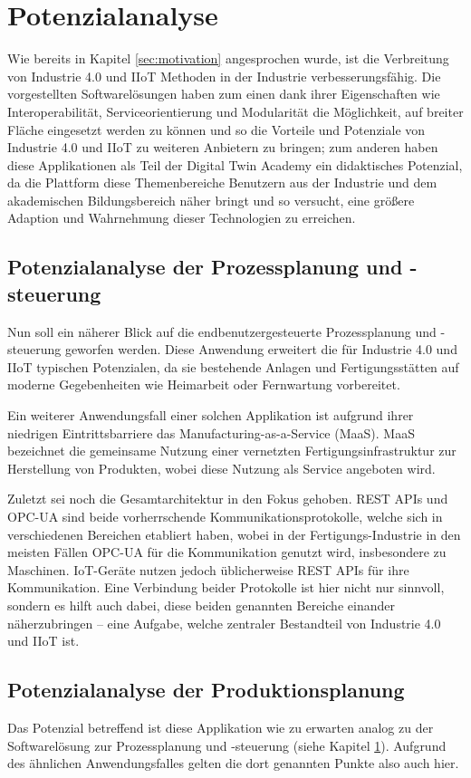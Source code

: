\section{Potenzialanalyse}
\label{sec:potenzialanalyse}

Wie bereits in Kapitel \ref{sec:motivation} angesprochen wurde, ist die Verbreitung von Industrie 4.0 und IIoT Methoden in der Industrie verbesserungsfähig. Die vorgestellten Softwarelösungen haben zum einen dank ihrer Eigenschaften wie Interoperabilität, Serviceorientierung und Modularität die Möglichkeit, auf breiter Fläche eingesetzt werden zu können und so die Vorteile und Potenziale von Industrie 4.0 und IIoT zu weiteren Anbietern zu bringen; zum anderen haben diese Applikationen als Teil der Digital Twin Academy ein didaktisches Potenzial, da die Plattform diese Themenbereiche Benutzern aus der Industrie und dem akademischen Bildungsbereich näher bringt und so versucht, eine größere Adaption und Wahrnehmung dieser Technologien zu erreichen.

\subsection*{Potenzialanalyse der Prozessplanung und -steuerung}

Nun soll ein näherer Blick auf die endbenutzergesteuerte Prozessplanung und -steuerung geworfen werden. Diese Anwendung erweitert die für Industrie 4.0 und IIoT typischen Potenzialen, da sie bestehende Anlagen und Fertigungsstätten auf moderne Gegebenheiten wie Heimarbeit oder Fernwartung vorbereitet.

Ein weiterer Anwendungsfall einer solchen Applikation ist aufgrund ihrer niedrigen Eintrittsbarriere das Manufacturing-as-a-Service (MaaS). MaaS bezeichnet die gemeinsame Nutzung einer vernetzten Fertigungsinfrastruktur zur Herstellung von Produkten, wobei diese Nutzung als Service angeboten wird. 

Zuletzt sei noch die Gesamtarchitektur in den Fokus gehoben. REST APIs und OPC-UA sind beide vorherrschende Kommunikationsprotokolle, welche sich in verschiedenen Bereichen etabliert haben, wobei in der Fertigungs-Industrie in den meisten Fällen OPC-UA für die Kommunikation genutzt wird, insbesondere zu Maschinen. IoT-Geräte nutzen jedoch üblicherweise REST APIs für ihre Kommunikation. Eine Verbindung beider Protokolle ist hier nicht nur sinnvoll, sondern es hilft auch dabei, diese beiden genannten Bereiche einander näherzubringen – eine Aufgabe, welche zentraler Bestandteil von Industrie 4.0  und IIoT ist.

\subsection*{Potenzialanalyse der Produktionsplanung}

Das Potenzial betreffend ist diese Applikation wie zu erwarten analog zu der Softwarelösung zur Prozessplanung und -steuerung (siehe Kapitel \ref{sec:potenzialanalyse}). Aufgrund des ähnlichen Anwendungsfalles gelten die dort genannten Punkte also auch hier.
